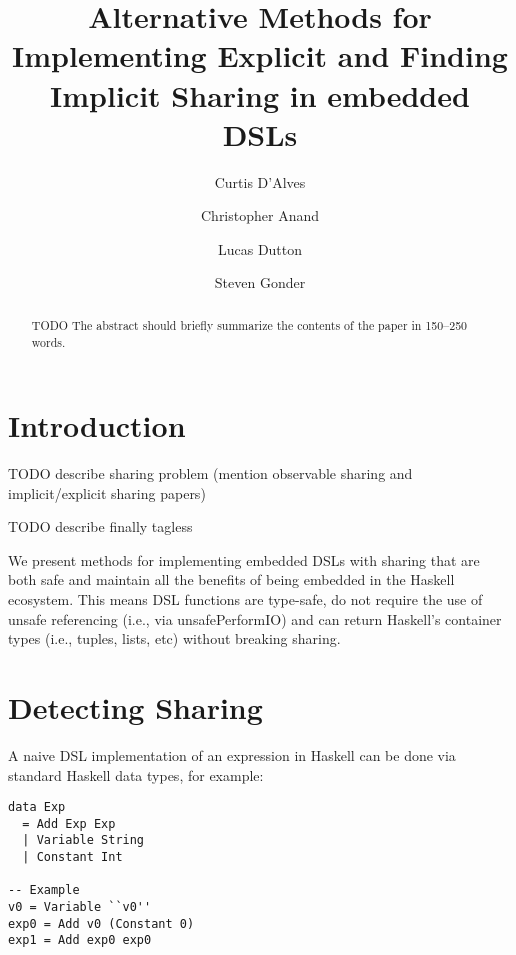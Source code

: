 \documentclass[runningheads]{llncs}
\begin{document}
\lstset{language=haskell}
%
\title{Alternative Methods for Implementing
    Explicit and Finding Implicit Sharing in embedded DSLs}
%
%
\author{Curtis D'Alves \and
Christopher Anand \and
Lucas Dutton \and
Steven Gonder
}
%
%
%
\maketitle              %
%
\begin{abstract}
TODO The abstract should briefly summarize the contents of the paper in
150--250 words.

\end{abstract}
%
%
%
\section{Introduction}

TODO describe sharing problem (mention observable sharing
\cite{gill:observablesharing} and implicit/explicit sharing
\cite{kiselyov:sharing} papers)

TODO describe finally tagless \cite{carette:finallytagless}

We present methods for implementing embedded DSLs with sharing that are both
safe and maintain all the benefits of being embedded in the Haskell ecosystem.
This means DSL functions are type-safe, do not require the use of unsafe
referencing (i.e., via unsafePerformIO) and can return Haskell's container
types (i.e., tuples, lists, etc) without breaking sharing.

\section{Detecting Sharing}

A naive DSL implementation of an expression in Haskell can be done via standard
Haskell data types, for example:

\begin{lstlisting}
data Exp
  = Add Exp Exp
  | Variable String
  | Constant Int

-- Example
v0 = Variable ``v0''
exp0 = Add v0 (Constant 0)
exp1 = Add exp0 exp0
\end{lstlisting}
\end{document}
